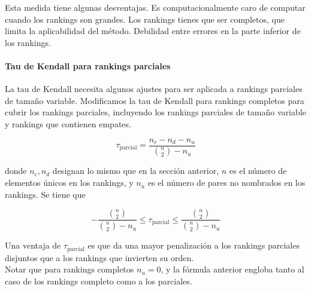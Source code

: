  Esta medida tiene algunas desventajas. Es computacionalmente caro de computar cuando los rankings son grandes. Los rankings tienes que ser completos, que limita la aplicabilidad del método. Debilidad entre errores en la parte inferior de los rankings.
 
 \paragraph{Tau de Kendall para rankings parciales}
 
 La tau de Kendall necesita algunos ajustes para ser aplicada a rankings parciales de tamaño variable. Modificamos la tau de Kendall para rankings completos para cubrir los rankings parciales, incluyendo los rankings parciales de tamaño variable y rankings que contienen empates.
 
 \[ \tau_{\text{parcial}} = \dfrac{n_c - n_d - n_u}{\binom{n}{2} - n_u} \]
 
 donde $n_c, n_d$ designan lo mismo que en la sección anterior, $n$ es el número de elementos únicos en los rankings, y $n_u$ es el número de pares no nombrados en los rankings. Se tiene que 
 
 \[ -\dfrac{\binom{n}{2}}{\binom{n}{2} - n_u} \leq \tau_{\text{parcial}} \leq \dfrac{\binom{n}{2}}{\binom{n}{2} - n_u} \]
 
 Una ventaja de $\tau_{\text{parcial}}$ es que da una mayor penalización a los rankings parciales disjuntos que a los rankings que invierten su orden.\\
 
 Notar que para rankings completos $n_u = 0$, y la fórmula anterior engloba tanto al caso de los rankings completo como a los parciales.